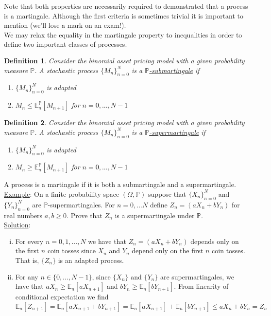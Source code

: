 \documentclass[12pt]{article}
\newtheorem{definition}{Definition}
\newlength\tindent
\renewcommand{\indent}{\hspace*{\tindent}}
\renewcommand{\P}{\mathbb P}
\newcommand{\E}{\mathbb E}
\begin{document}
\indent Note that both properties are necessarily required to demonstrated that a process is a martingale. Although the first criteria is sometimes trivial it is important to mention (we'll lose a mark on an exam!). \\

\indent We may relax the equality in the martingale property to inequalities in order to define two important classes of processes.

\begin{definition} Consider the binomial asset pricing model with a given probability measure $\P$. A stochastic process $\{M_n\}^N_{n = 0}$ is a \underline{$\P$-submartingale} if
\begin{enumerate}
	\item $\{M_n\}_{n = 0}^N$ is adapted
	\item $M_n \leq \E^\P_n[M_{n + 1}]$ for $n = 0, ..., N - 1$
\end{enumerate}
\end{definition}

\begin{definition} Consider the binomial asset pricing model with a given probability measure $\P$. A stochastic process $\{M_n\}^N_{n = 0}$ is a \underline{$\P$-supermartingale} if
\begin{enumerate}
	\item $\{M_n\}_{n = 0}^N$ is adapted
	\item $M_n \geq \E^\P_n[M_{n + 1}]$ for $n = 0, ..., N - 1$
\end{enumerate}
\end{definition}

A process is a martingale if it is both a submartingale and a supermartingale. \\

\underline{Example}: On a finite probability space $(\Omega, \P)$ suppose that $\{X_n\}^N_{n = 0}$ and $\{Y_n\}^N_{n = 0}$ are $\P$-supermartingales. For $n = 0, ... N$ define $Z_n = (aX_n + bY_n)$ for real numbers $a, b \geq 0$. Prove that $Z_n$ is a supermartingale under $\P$. \\

\underline{Solution}:
\begin{enumerate}[(i)]
	\item For every $n = 0, 1, ..., N$ we have that $Z_n = (aX_n + bY_n)$ depends only on the first $n$ coin tosses since $X_n$ and $Y_n$ depend only on the first $n$ coin tosses. That is, $\{Z_n\}$ is an adapted process.
	\item For any $n \in \{0, ... , N - 1\}$, since $\{X_n\}$ and $\{Y_n\}$ are supermartingales, we have that $aX_n \geq \E_n[aX_{n + 1}]$ and $bY_n \geq \E_n[bY_{n + 1}]$. From linearity of conditional expectation we find
	\begin{equation*}
		\E_n[Z_{n + 1}] = \E_n[aX_{n + 1} + bY_{n + 1}] = \E_n[aX_{n + 1}] + \E_n[bY_{n + 1}] \leq aX_n + bY_n = Z_n
	\end{equation*}
\end{enumerate}
\end{document}
